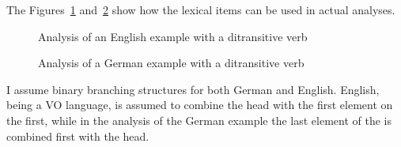 \largerpage
The Figures~\ref{fig-nobody-gives-him-the-book}
and~\ref{fig-niemand-ihm-das-buch-gibt} show how the lexical items can be used in actual analyses.

\begin{figure}
\caption{Analysis of an English example with a ditransitive verb}\label{fig-nobody-gives-him-the-book}
\end{figure}



\begin{figure}
\caption{Analysis of a German example with a ditransitive verb}\label{fig-niemand-ihm-das-buch-gibt}
\end{figure}
I assume binary branching structures for both German and English. English, being a VO language, is assumed to combine the
head with the first element on the \compsl first, while in the analysis of the German example the last element of the
\compsl is combined first with the head.

